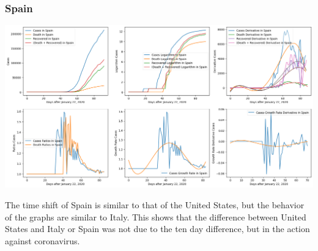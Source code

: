 \documentclass{report}
\begin{document}
            \subsubsection{Spain}
                \begin{center}
                    \includegraphics[width=\textwidth]{plots/spain/analyze.png}
                \end{center}
                The time shift of Spain is similar to that of the United States, but the behavior of the graphs are similar to Italy. This shows that the difference between United States and Italy or Spain was not due to the ten day difference, but in the action against coronavirus.
\end{document}
